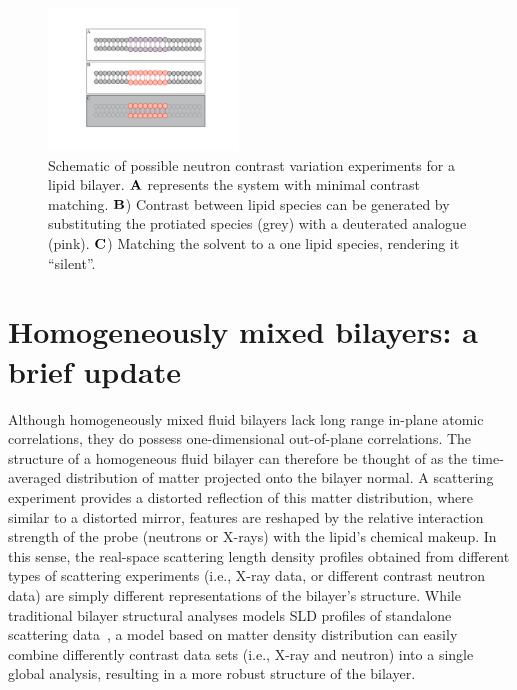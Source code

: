 \documentclass[8.5pt,twoside,twocolumn]{article}
\begin{document}
\begin{figure}
	\centering
	\includegraphics[width=0.45\textwidth]{figures/contrast}
	\caption{Schematic of possible neutron contrast variation experiments for a~ lipid bilayer. $\bf{A}$ represents the system with minimal contrast matching. $\bf{B}$) Contrast between lipid species can be generated by substituting the protiated species (grey) with a deuterated analogue (pink). $\bf{C}$) Matching the solvent to a one lipid species, rendering it ``silent''.}
	\label{contrast}
\end{figure}

\section{Homogeneously mixed bilayers: a brief update}
\label{sec:sdp}
Although homogeneously mixed fluid bilayers lack long range in-plane atomic correlations, they do possess one-dimensional out-of-plane correlations. The structure of a homogeneous fluid bilayer can therefore be thought of as the time-averaged distribution of matter projected onto the bilayer normal. A scattering experiment provides a distorted reflection of this matter distribution, where similar to a distorted mirror, features are reshaped by the relative interaction strength of the probe (neutrons or X-rays) with the lipid's chemical makeup. In this sense, the real-space scattering length density profiles obtained from different types of scattering experiments (i.e., X-ray data, or different contrast neutron data) are simply different representations of the bilayer's structure.  While traditional bilayer structural analyses models SLD profiles of standalone scattering data~\cite{Pabst.2000,Kucerka.2004,Kiselev.2006,Pencer.2006,Brzustowicz.2005,OliveiraCristianoL.P..2012}, a model based on matter density distribution can easily combine differently contrast  data sets (i.e., X-ray and neutron) into a single global analysis, resulting in a more robust structure of the bilayer. 
\end{document}
